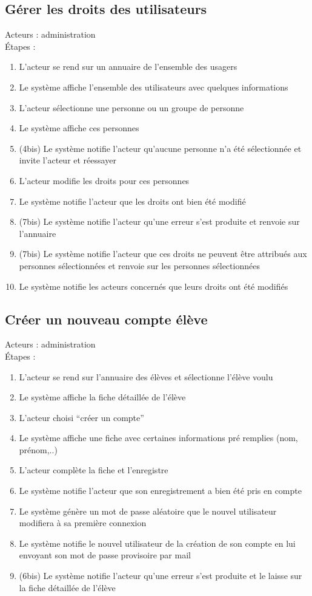 \documentclass{scrreprt}
\begin{document}
\subsection{Gérer les droits des utilisateurs}
Acteurs : administration
\\
\'Etapes :
\begin{enumerate}
\item L’acteur se rend sur un annuaire de l’ensemble des usagers
\item Le système affiche l’ensemble des utilisateurs avec quelques informations
\item L’acteur sélectionne une personne ou un groupe de personne
\item Le système affiche ces personnes
\item (4bis) Le système notifie l’acteur qu’aucune personne n’a été sélectionnée et invite l’acteur et réessayer
\item L’acteur modifie les droits pour ces personnes
\item Le système notifie l’acteur que les droits ont bien été modifié
\item (7bis) Le système notifie l’acteur qu’une erreur s’est produite et renvoie sur l’annuaire
\item (7bis) Le système notifie l’acteur que ces droits ne peuvent être attribués aux personnes sélectionnées et renvoie sur les personnes sélectionnées
\item Le système notifie les acteurs concernés que leurs droits ont été modifiés
\end{enumerate}
\subsection{Créer un nouveau compte élève}
Acteurs : administration
\\
\'Etapes :
\begin{enumerate}
\item L’acteur se rend sur l’annuaire des élèves et sélectionne l’élève voulu
\item Le système affiche la fiche détaillée de l’élève
\item L’acteur choisi “créer un compte”
\item Le système affiche une fiche avec certaines informations pré remplies (nom, prénom,..)
\item L’acteur complète la fiche et l’enregistre 
\item Le système notifie l’acteur que son enregistrement a bien été pris en compte
\item Le système génère un mot de passe aléatoire que le nouvel utilisateur modifiera à sa première connexion
\item Le système notifie le nouvel utilisateur de la création de son compte en lui envoyant son mot de passe provisoire par mail
\item (6bis) Le système notifie l’acteur qu’une erreur s’est produite et le laisse sur la fiche détaillée de l’élève
\end{enumerate}
\newpage
\end{document}
